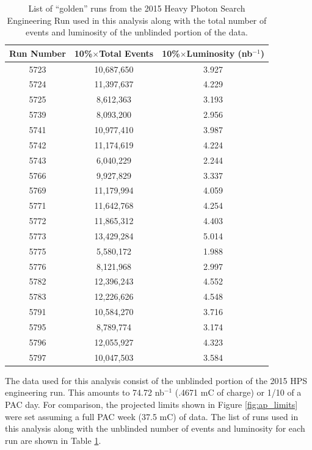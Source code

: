 \begin{table}[h!t]
    \centering
    \begin{tabular}{ccc}
        \toprule
        \textbf{Run Number} 
        & \textbf{10\%$\times$Total Events} 
        & \textbf{10\%$\times$Luminosity (nb$^{-1}$)} \\
        \midrule
        \midrule
        5723 & 10,687,650 & 3.927 \\
        5724 & 11,397,637 & 4.229 \\
        5725 &  8,612,363 & 3.193 \\
        5739 &  8,093,200 & 2.956 \\
        5741 & 10,977,410 & 3.987 \\
        5742 & 11,174,619 & 4.224 \\
        5743 &  6,040,229 & 2.244 \\
        5766 &  9,927,829 & 3.337 \\
        5769 & 11,179,994 & 4.059 \\
        5771 & 11,642,768 & 4.254 \\
        5772 & 11,865,312 & 4.403 \\
        5773 & 13,429,284 & 5.014 \\
        5775 &  5,580,172 & 1.988 \\
        5776 &  8,121,968 & 2.997 \\
        5782 & 12,396,243 & 4.552 \\
        5783 & 12,226,626 & 4.548 \\
        5791 & 10,584,270 & 3.716 \\ 
        5795 &  8,789,774 & 3.174 \\
        5796 & 12,055,927 & 4.323 \\ 
        5797 & 10,047,503 & 3.584 \\
        \bottomrule
    \end{tabular}
    \caption{List of ``golden'' runs from the 2015 Heavy Photon Search 
             Engineering Run used in this analysis along with the total number
             of events and luminosity of the unblinded portion of the data.}
    \label{tab:data}
\end{table}

The data used for this analysis consist of the unblinded portion of the 2015 
HPS engineering run.  This amounts to 74.72 nb$^{-1}$ (.4671 mC of charge) or 
1/10 of a PAC day.  For comparison, the projected limits shown in Figure 
\ref{fig:ap_limits} were set assuming a full PAC week (37.5 mC) of data.
The list of runs used in this analysis along with the unblinded number of 
events and luminosity for each run are shown in Table \ref{tab:data}.

